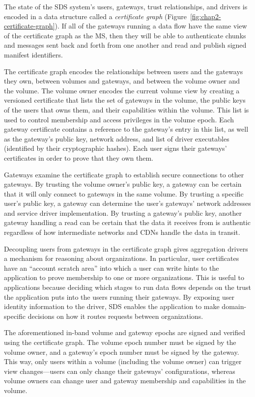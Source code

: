 The state of the SDS system's users, gateways, trust relationships, and drivers
is encoded in a data structure called a \emph{certificate graph}
(Figure~\ref{fig:chap2-certificate-graph}).  If all
of the gateways running a data flow have the same view of the certificate graph
as the MS, then they will be able to authenticate chunks and messages sent back and forth from one another
and read and publish signed manifest identifiers.

The certificate graph encodes the relationships between users and the gateways
they own, between volumes and gateways, and between the volume owner and the volume.
The volume owner encodes the current volume view by creating a versioned certificate that lists the set of gateways
in the volume, the public keys of the users that owns them, and their capabilities within the
volume.  This list is used to control membership and access
privileges in the volume epoch.  Each gateway certificate contains a reference to the gateway's
entry in this list, as well as the gateway's public key, network address, and list of
driver executables (identified by their cryptographic hashes).  Each user signs
their gateways' certificates in order to prove that they own them.

Gateways examine the certificate graph to establish secure connections to other
gateways.  By trusting the volume owner's public key, a gateway can be certain that it will
only connect to gateways in the same volume.  By trusting a specific user's
public key, a gateway can determine the user's gateways' network addresses and
service driver implementation.  By trusting a gateway's public key, another gateway
handling a read can be certain that the data it receives from is authentic regardless of how
intermediate networks and CDNs handle the data in transit.

Decoupling users from gateways in the certificate graph gives aggregation
drivers a mechanism for reasoning about organizations.  In particular, user
certificates have an ``account scratch area'' into which a user can write hints to the
application to prove membership to one or more organizations.  This is useful
to applications because deciding which
stages to run data flows depends on the trust the application
puts into the users running their gateways.  By exposing user identity
information to the driver, SDS enables the application to make domain-specific
decisions on how it routes requests between organizations.

The aforementioned in-band volume and gateway epochs are signed and
verified using the certificate graph.  The volume epoch number must be signed by
the volume owner, and a gateway's epoch number must be signed by the gateway.
This way, only users within a volume (including the volume owner) can trigger
view changes---users can only change their gateways' configurations, whereas volume
owners can change user and gateway membership and capabilities in the volume.

